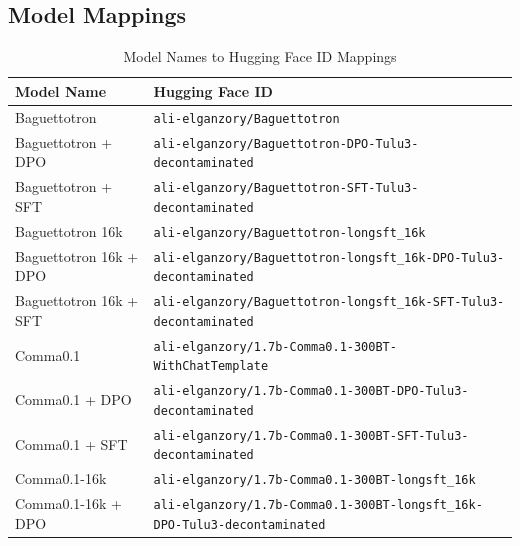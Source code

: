 \subsection{Model Mappings}
\begin{table}[ht]
\centering
\caption{Model Names to Hugging Face ID Mappings}
\label{tab:model_mapping}
\scriptsize
\begin{tabular}{lp{10cm}}
\toprule
\textbf{Model Name} & \textbf{Hugging Face ID} \\
\midrule
Baguettotron & \texttt{ali-\allowbreak{}elganzory/\allowbreak{}Baguettotron} \\
Baguettotron + DPO & \texttt{ali-\allowbreak{}elganzory/\allowbreak{}Baguettotron-\allowbreak{}DPO-\allowbreak{}Tulu3-\allowbreak{}decontaminated} \\
Baguettotron + SFT & \texttt{ali-\allowbreak{}elganzory/\allowbreak{}Baguettotron-\allowbreak{}SFT-\allowbreak{}Tulu3-\allowbreak{}decontaminated} \\
Baguettotron 16k & \texttt{ali-\allowbreak{}elganzory/\allowbreak{}Baguettotron-\allowbreak{}longsft\_16k} \\
Baguettotron 16k + DPO & \texttt{ali-\allowbreak{}elganzory/\allowbreak{}Baguettotron-\allowbreak{}longsft\_16k-\allowbreak{}DPO-\allowbreak{}Tulu3-\allowbreak{}decontaminated} \\
Baguettotron 16k + SFT & \texttt{ali-\allowbreak{}elganzory/\allowbreak{}Baguettotron-\allowbreak{}longsft\_16k-\allowbreak{}SFT-\allowbreak{}Tulu3-\allowbreak{}decontaminated} \\
Comma0.1 & \texttt{ali-\allowbreak{}elganzory/\allowbreak{}1.7b-\allowbreak{}Comma0.1-\allowbreak{}300BT-\allowbreak{}WithChatTemplate} \\
Comma0.1 + DPO & \texttt{ali-\allowbreak{}elganzory/\allowbreak{}1.7b-\allowbreak{}Comma0.1-\allowbreak{}300BT-\allowbreak{}DPO-\allowbreak{}Tulu3-\allowbreak{}decontaminated} \\
Comma0.1 + SFT & \texttt{ali-\allowbreak{}elganzory/\allowbreak{}1.7b-\allowbreak{}Comma0.1-\allowbreak{}300BT-\allowbreak{}SFT-\allowbreak{}Tulu3-\allowbreak{}decontaminated} \\
Comma0.1-16k & \texttt{ali-\allowbreak{}elganzory/\allowbreak{}1.7b-\allowbreak{}Comma0.1-\allowbreak{}300BT-\allowbreak{}longsft\_16k} \\
Comma0.1-16k + DPO & \texttt{ali-\allowbreak{}elganzory/\allowbreak{}1.7b-\allowbreak{}Comma0.1-\allowbreak{}300BT-\allowbreak{}longsft\_16k-\allowbreak{}DPO-\allowbreak{}Tulu3-\allowbreak{}decontaminated} \\

\end{tabular}
\end{table}
